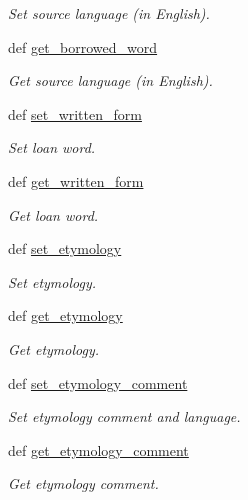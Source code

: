 \begin{DoxyCompactItemize}
\begin{DoxyCompactList}\small\item\em Set source language (in English). \end{DoxyCompactList}\item 
def \hyperlink{classlmf_1_1src_1_1core_1_1sense_1_1_sense_a228d6a83808888d3805c06657c8f9153}{get\+\_\+borrowed\+\_\+word}
\begin{DoxyCompactList}\small\item\em Get source language (in English). \end{DoxyCompactList}\item 
def \hyperlink{classlmf_1_1src_1_1core_1_1sense_1_1_sense_adce959778963de3b295d05f81fa83390}{set\+\_\+written\+\_\+form}
\begin{DoxyCompactList}\small\item\em Set loan word. \end{DoxyCompactList}\item 
def \hyperlink{classlmf_1_1src_1_1core_1_1sense_1_1_sense_a06bf005156e07ed1262d53193bb75dc3}{get\+\_\+written\+\_\+form}
\begin{DoxyCompactList}\small\item\em Get loan word. \end{DoxyCompactList}\item 
def \hyperlink{classlmf_1_1src_1_1core_1_1sense_1_1_sense_a53537f8c8c41b7ad740fef272c9f8658}{set\+\_\+etymology}
\begin{DoxyCompactList}\small\item\em Set etymology. \end{DoxyCompactList}\item 
def \hyperlink{classlmf_1_1src_1_1core_1_1sense_1_1_sense_ae41863c9c5fdf94f3f29c13d6b1fe1cf}{get\+\_\+etymology}
\begin{DoxyCompactList}\small\item\em Get etymology. \end{DoxyCompactList}\item 
def \hyperlink{classlmf_1_1src_1_1core_1_1sense_1_1_sense_a621686bc8d18f6abd0f9a284f9c4b938}{set\+\_\+etymology\+\_\+comment}
\begin{DoxyCompactList}\small\item\em Set etymology comment and language. \end{DoxyCompactList}\item 
def \hyperlink{classlmf_1_1src_1_1core_1_1sense_1_1_sense_a60c30c7573483fd9d987c8c439688213}{get\+\_\+etymology\+\_\+comment}
\begin{DoxyCompactList}\small\item\em Get etymology comment. \end{DoxyCompactList}\item 

\end{DoxyCompactItemize}
